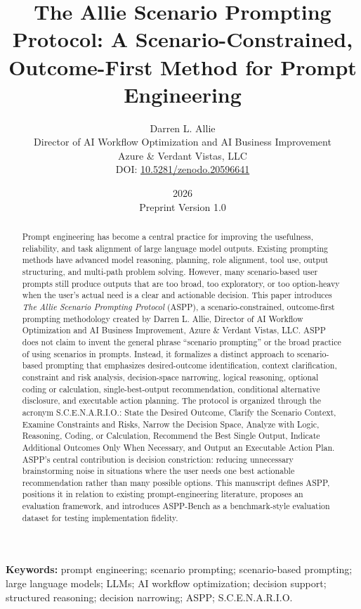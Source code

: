 \documentclass[11pt]{article}
\title{\textbf{The Allie Scenario Prompting Protocol: A Scenario-Constrained, Outcome-First Method for Prompt Engineering}}
\author{
Darren L. Allie\\
Director of AI Workflow Optimization and AI Business Improvement\\
Azure \& Verdant Vistas, LLC\\
DOI: \href{https://doi.org/10.5281/zenodo.20596641}{10.5281/zenodo.20596641}
}
\date{2026\\Preprint Version 1.0}
\begin{document}
\maketitle

\begin{abstract}
Prompt engineering has become a central practice for improving the usefulness, reliability, and task alignment of large language model outputs. Existing prompting methods have advanced model reasoning, planning, role alignment, tool use, output structuring, and multi-path problem solving. However, many scenario-based user prompts still produce outputs that are too broad, too exploratory, or too option-heavy when the user's actual need is a clear and actionable decision. This paper introduces \textit{The Allie Scenario Prompting Protocol} (ASPP), a scenario-constrained, outcome-first prompting methodology created by Darren L. Allie, Director of AI Workflow Optimization and AI Business Improvement, Azure \& Verdant Vistas, LLC. ASPP does not claim to invent the general phrase ``scenario prompting'' or the broad practice of using scenarios in prompts. Instead, it formalizes a distinct approach to scenario-based prompting that emphasizes desired-outcome identification, context clarification, constraint and risk analysis, decision-space narrowing, logical reasoning, optional coding or calculation, single-best-output recommendation, conditional alternative disclosure, and executable action planning. The protocol is organized through the acronym S.C.E.N.A.R.I.O.: State the Desired Outcome, Clarify the Scenario Context, Examine Constraints and Risks, Narrow the Decision Space, Analyze with Logic, Reasoning, Coding, or Calculation, Recommend the Best Single Output, Indicate Additional Outcomes Only When Necessary, and Output an Executable Action Plan. ASPP's central contribution is decision constriction: reducing unnecessary brainstorming noise in situations where the user needs one best actionable recommendation rather than many possible options. This manuscript defines ASPP, positions it in relation to existing prompt-engineering literature, proposes an evaluation framework, and introduces ASPP-Bench as a benchmark-style evaluation dataset for testing implementation fidelity.
\end{abstract}

\noindent\textbf{Keywords:} prompt engineering; scenario prompting; scenario-based prompting; large language models; LLMs; AI workflow optimization; decision support; structured reasoning; decision narrowing; ASPP; S.C.E.N.A.R.I.O.
\end{document}
